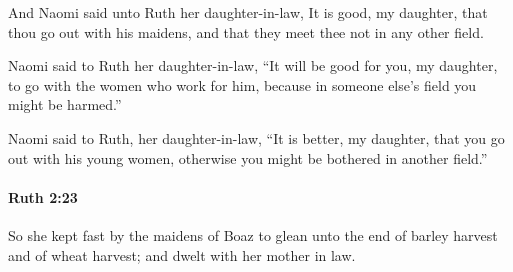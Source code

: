 			\begin{versebox}
					\item[BHS] 
					\item[LXX] 
					\item[ASV] And Naomi said unto Ruth her daughter-in-law, It is good, my daughter, that thou go out with his maidens, and that they meet thee not in any other field.
					\item[NIV] Naomi said to Ruth her daughter-in-law, “It will be good for you, my daughter, to go with the women who work for him, because in someone else’s field you might be harmed.”
					\item[NRSV] Naomi said to Ruth, her daughter-in-law, “It is better, my daughter, that you go out with his young women, otherwise you might be bothered in another field.”
			\end{versebox}

		\paragraph{Ruth 2:23} %
			\label{RUTH-2-23}

			So she kept fast by the maidens of Boaz to glean unto the end of barley harvest and of wheat harvest; and dwelt with her mother in law.

